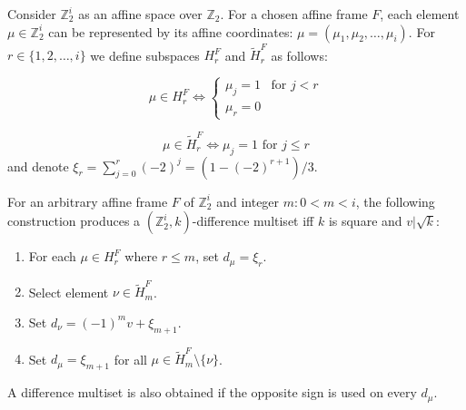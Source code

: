 Consider $\mathbb Z_2^i$ as an affine space over $\mathbb Z_2$. For a chosen affine frame $F$, each element $\mu\in\mathbb Z_2^i$ can be represented by its affine coordinates: $\mu=(\mu_1, \mu_2, \ldots, \mu_i)$. For $r\in\{1,2,\ldots,i\}$ we define subspaces $H_r^F$ and $\widetilde H_r^F$ as follows:

\begin{equation}
    \mu \in H_r^F \iff 
        \begin{cases}
            \mu_j = 1 & \text{for } j < r \\
            \mu_r = 0
        \end{cases}
\end{equation}

\begin{equation}
    \mu \in \widetilde H_r^F \iff 
        \mu_j = 1 \text{ for } j \leq r
\end{equation}
and denote $\xi_r = \sum\limits_{j=0}^r (-2)^j=(1-(-2)^{r+1})/3$.

\begin{theorem}
    \label{z2i:theorem:construction}
    For an arbitrary affine frame $F$ of $\mathbb Z_2^i$ and integer $m \colon 0 < m < i$, the following construction produces a $(\mathbb Z_2^i, k)$-difference multiset iff $k$ is square and $v | \sqrt k$:
    \begin{enumerate}
        \item For each $\mu \in H_r^F$ where $r \leq m$, set $d_\mu = \xi_r$.
        \item Select element $\nu \in \widetilde H_m^F$.
        \item Set $d_\nu = (-1)^m v + \xi_{m+1}$.
        \item Set $d_\mu = \xi_{m+1}$ for all $\mu \in \widetilde H_m^F\setminus\{\nu\}$.
    \end{enumerate}
    A difference multiset is also obtained if the opposite sign is used on every $d_\mu$.
\end{theorem}

